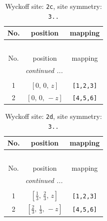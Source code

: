\documentclass[fleqn,8pt]{jsarticle}
\begin{document}
\begin{longtable}{ccc}
\caption{Wyckoff site: {\tt 2c}, site symmetry: {\tt 3..}}
 \\
 \hline \hline
No. & position & mapping \\ \hline \endfirsthead

\multicolumn{2}{l}{\tablename\ \thetable{}} \\
 \hline \hline
No. & position & mapping \\ \hline \endhead

 \hline \hline
\multicolumn{2}{r}{\footnotesize\it continued ...} \\ \endfoot

 \hline \hline
\multicolumn{2}{r}{} \\ \endlastfoot

1 & $\left[ 0,\, 0,\, z \right]$ & {\tt [1,2,3]} \\ \hline
2 & $\left[ 0,\, 0,\, - z \right]$ & {\tt [4,5,6]} \\
\end{longtable}
\renewcommand{\arraystretch}{1.2}
\begin{longtable}{ccc}
\caption{Wyckoff site: {\tt 2d}, site symmetry: {\tt 3..}}
 \\
 \hline \hline
No. & position & mapping \\ \hline \endfirsthead

\multicolumn{2}{l}{\tablename\ \thetable{}} \\
 \hline \hline
No. & position & mapping \\ \hline \endhead

 \hline \hline
\multicolumn{2}{r}{\footnotesize\it continued ...} \\ \endfoot

 \hline \hline
\multicolumn{2}{r}{} \\ \endlastfoot

1 & $\left[ \frac{1}{3},\, \frac{2}{3},\, z \right]$ & {\tt [1,2,3]} \\ \hline
2 & $\left[ \frac{2}{3},\, \frac{1}{3},\, - z \right]$ & {\tt [4,5,6]} \\
\end{longtable}
\renewcommand{\arraystretch}{1.2}
\end{document}

